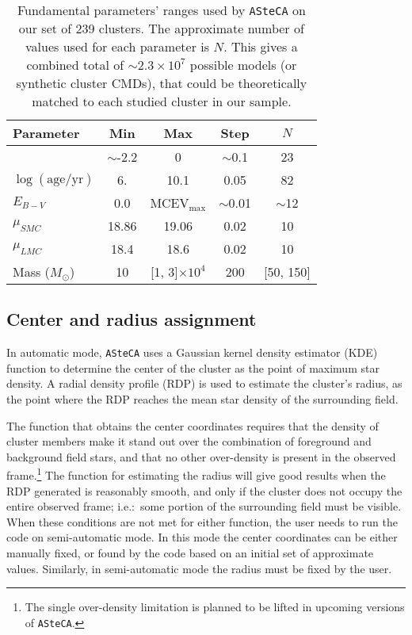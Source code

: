 \documentclass[draft]{aa}
\begin{document}
\begin{table}
\centering
\caption{Fundamental parameters' ranges used by \texttt{ASteCA} on our set
of 239 clusters. The approximate number of values used for each parameter is
$N$. This gives a combined total of ${\sim}2.3 {\times}10^7$ possible models 
(or synthetic cluster CMDs), that could be theoretically matched to each studied
cluster in our sample.}
\label{tab:ga-range}
\begin{tabular}{lcccc}
\hline\hline
 Parameter & Min & Max & Step & $N$\\
\hline
[Fe/H] & $\sim$-2.2 & 0 & $\sim$0.1 & 23\\
$\log\mathrm{(age/yr)}$ & 6. & 10.1 & 0.05 & 82\\
$E_{B-V}$ & 0.0 & MCEV$_{\max}$ & ${\sim}$0.01 & $\sim$12\\
$\mu_{SMC}$ & 18.86 & 19.06 & 0.02 & 10\\
$\mu_{LMC}$ & 18.4 & 18.6 & 0.02 & 10\\
Mass ($M_{\odot}$) & 10 & [1, 3]${\times}10^{4}$ & 200 & [50, 150]\\
\hline
\end{tabular}
\end{table}



\subsection{Center and radius assignment}
\label{ssec:centre-radius}

In automatic mode, \texttt{ASteCA} uses a Gaussian kernel density estimator 
(KDE) function to determine the center of the cluster as the point of maximum
star density.
A radial density profile (RDP) is used to estimate the cluster's radius, as the
point where the RDP reaches the mean star density of the surrounding field.

The function that obtains the center coordinates requires that the density of
cluster members make it stand out over the combination of foreground and
background field stars, and that no other over-density is present in the
observed frame.\footnote{The single over-density limitation is planned to be
lifted in upcoming versions of \texttt{ASteCA}.}
The function for estimating the radius will give good results when the RDP
generated is reasonably smooth, and only if the cluster does not occupy the
entire observed frame; i.e.:\ some portion of the surrounding field must be
visible.
%
When these conditions are not met for either function, the user needs to run
the code on semi-automatic mode. In this mode the center coordinates can be
either manually fixed, or found by the code based on an initial set of
approximate values. Similarly, in semi-automatic mode the radius must be fixed
by the user.
\end{document}
